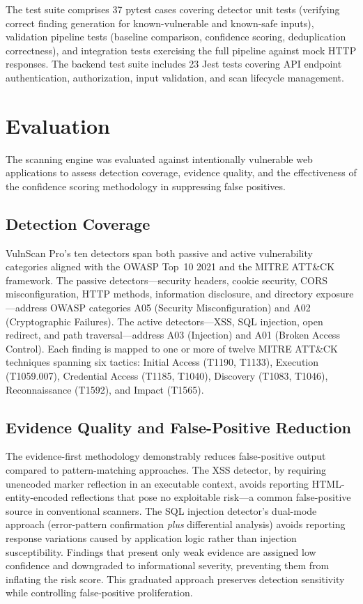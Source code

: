 \documentclass[conference]{IEEEtran}
\begin{document}
The test suite comprises 37 pytest cases covering detector unit tests (verifying correct finding generation for known-vulnerable and known-safe inputs), validation pipeline tests (baseline comparison, confidence scoring, deduplication correctness), and integration tests exercising the full pipeline against mock HTTP responses. The backend test suite includes 23 Jest tests covering API endpoint authentication, authorization, input validation, and scan lifecycle management.

\section{Evaluation}

The scanning engine was evaluated against intentionally vulnerable web applications to assess detection coverage, evidence quality, and the effectiveness of the confidence scoring methodology in suppressing false positives.

\subsection{Detection Coverage}

VulnScan Pro's ten detectors span both passive and active vulnerability categories aligned with the OWASP Top~10 2021 and the MITRE ATT\&CK framework. The passive detectors---security headers, cookie security, CORS misconfiguration, HTTP methods, information disclosure, and directory exposure---address OWASP categories A05 (Security Misconfiguration) and A02 (Cryptographic Failures). The active detectors---XSS, SQL injection, open redirect, and path traversal---address A03 (Injection) and A01 (Broken Access Control). Each finding is mapped to one or more of twelve MITRE ATT\&CK techniques spanning six tactics: Initial Access (T1190, T1133), Execution (T1059.007), Credential Access (T1185, T1040), Discovery (T1083, T1046), Reconnaissance (T1592), and Impact (T1565).

\subsection{Evidence Quality and False-Positive Reduction}

The evidence-first methodology demonstrably reduces false-positive output compared to pattern-matching approaches. The XSS detector, by requiring unencoded marker reflection in an executable context, avoids reporting HTML-entity-encoded reflections that pose no exploitable risk---a common false-positive source in conventional scanners. The SQL injection detector's dual-mode approach (error-pattern confirmation \textit{plus} differential analysis) avoids reporting response variations caused by application logic rather than injection susceptibility. Findings that present only weak evidence are assigned low confidence and downgraded to informational severity, preventing them from inflating the risk score. This graduated approach preserves detection sensitivity while controlling false-positive proliferation.
\end{document}
